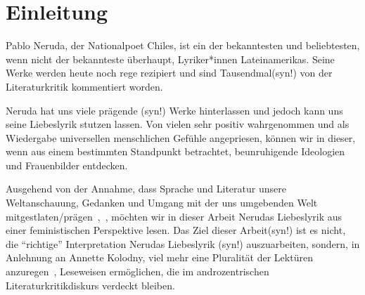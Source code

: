 \section{Einleitung}

Pablo Neruda, der Nationalpoet Chiles, ist ein der bekanntesten und beliebtesten, wenn nicht der bekannteste überhaupt, Lyriker*innen Lateinamerikas.
Seine Werke werden heute noch rege rezipiert und sind Tausendmal(syn!) von der Literaturkritik kommentiert worden.


Neruda hat uns viele prägende (syn!) Werke hinterlassen und jedoch kann uns seine Liebeslyrik stutzen lassen.
Von vielen sehr positiv wahrgenommen und als Wiedergabe universellen menschlichen Gefühle angepriesen, können wir in dieser, wenn aus einem bestimmten Standpunkt betrachtet, beunruhigende Ideologien und Frauenbilder entdecken.

Ausgehend von der Annahme, dass Sprache und Literatur unsere Weltanschauung, Gedanken und Umgang mit der uns umgebenden Welt mitgestlaten/prägen~\autocite{Kolodny1980},~\autocite{North2013},
möchten wir in dieser Arbeit Nerudas Liebeslyrik aus einer feministischen Perspektive lesen.
Das Ziel dieser Arbeit(syn!) ist es nicht, die ``richtige'' Interpretation Nerudas Liebeslyrik (syn!) auszuarbeiten, sondern, in Anlehnung an Annette Kolodny, viel mehr eine Pluralität der Lektüren anzuregen~\autocite{Kolodny1980}, Leseweisen ermöglichen, die im androzentrischen Literaturkritikdiskurs verdeckt bleiben.

\begin{comment}
``In my view, our purpose is not and should not be the formula-
tion of any single reading method or potentially procrustean set
of critical procedures nor, even less, the generation of prescriptive
categories for some dreamed-of nonsexist literary canon.52 Instead,
as I see it, our task is to initiate nothing less than a playful pluralism,
responsive to the possibilities of multiple critical schools and meth-
ods, but captive of none, recognizing that the many tools needed
for our analysis will necessarily be largely inherited and only partly
of our own making. Only by employing a plurality of methods
will we protect ourselves from the temptation of so oversimplifying
any text''~\cite{Kolodny1980}
\end{comment}

